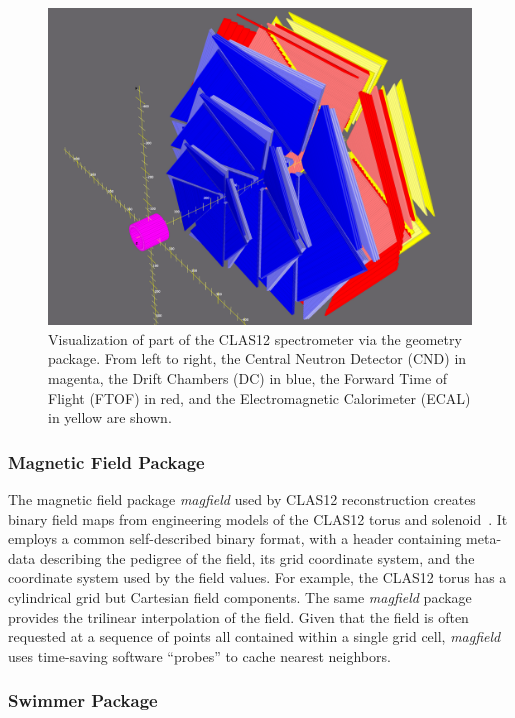 \begin{figure}
\centering
\includegraphics[width=1.0\columnwidth]{pics/detectorview.png}
\caption{Visualization of part of the CLAS12 spectrometer via the geometry package. From left to right, the Central
  Neutron Detector (CND) in magenta, the Drift Chambers (DC) in blue, the Forward Time of Flight (FTOF) in red,
  and the Electromagnetic Calorimeter (ECAL) in yellow are shown.}
\label{fig:detectorview}
\end{figure}

\subsubsection{Magnetic Field Package}

The magnetic field package {\it magfield} used by CLAS12 reconstruction creates binary field maps from
engineering models of the CLAS12 torus and solenoid~\cite{magnets-nim}. It employs a common self-described
binary format, with a header containing meta-data describing the pedigree of the field, its grid coordinate system,
and the coordinate system used by the field values. For example, the CLAS12 torus has a cylindrical grid but
Cartesian field components. The same {\it magfield} package provides the trilinear interpolation of the field.
Given that the field is often requested at a sequence of points all contained within a single grid cell, {\it magfield}
uses time-saving software “probes” to cache nearest neighbors.

\subsubsection{Swimmer Package}

